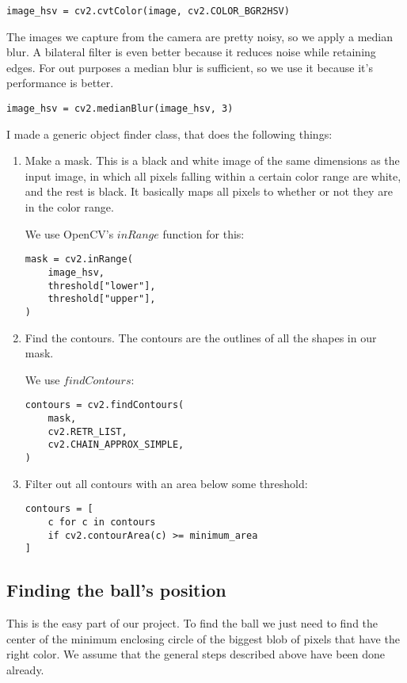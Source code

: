 \documentclass[12pt, a4paper]{article}
\begin{document}
\begin{lstlisting}
image_hsv = cv2.cvtColor(image, cv2.COLOR_BGR2HSV)
\end{lstlisting}

The images we capture from the camera are pretty noisy, so we apply a median blur. A bilateral filter is even better because it reduces noise while retaining edges. For out purposes a median blur is sufficient, so we use it because it's performance is better. \cite{openCVImageSmoothing}

\begin{lstlisting}
image_hsv = cv2.medianBlur(image_hsv, 3)
\end{lstlisting}

I made a generic object finder class, that does the following things:
\begin{enumerate}
	\item Make a mask. This is a black and white image of the same dimensions as the input image, in which all pixels falling within a certain color range are white, and the rest is black. It basically maps all pixels to whether or not they are in the color range.

	We use OpenCV's $inRange$ function for this:

	\begin{lstlisting}
mask = cv2.inRange(
	image_hsv,
	threshold["lower"],
	threshold["upper"],
)
	\end{lstlisting}
	\item Find the contours. The contours are the outlines of all the shapes in our mask.

	We use $findContours$:

	\begin{lstlisting}
contours = cv2.findContours(
	mask,
	cv2.RETR_LIST,
	cv2.CHAIN_APPROX_SIMPLE,
)
	\end{lstlisting}
	\item Filter out all contours with an area below some threshold:

	\begin{lstlisting}
contours = [
	c for c in contours
	if cv2.contourArea(c) >= minimum_area
]
	\end{lstlisting}
\end{enumerate}

\subsection{Finding the ball's position}
This is the easy part of our project. To find the ball we just need to find the center of the minimum enclosing circle of the biggest blob of pixels that have the right color. We assume that the general steps described above have been done already.
\end{document}
